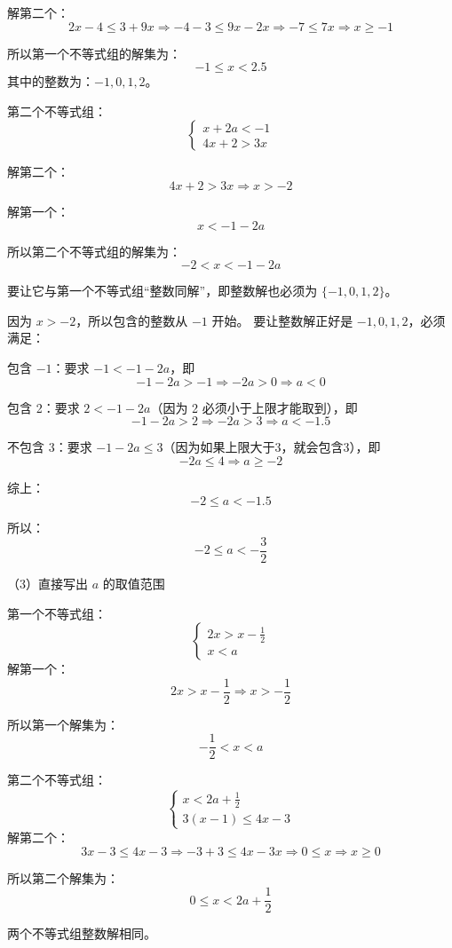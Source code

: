 解第二个：
\[
2x-4 \leq 3+9x \Rightarrow -4-3 \leq 9x-2x \Rightarrow -7 \leq 7x \Rightarrow x \geq -1
\]

所以第一个不等式组的解集为：
\[
-1 \leq x < 2.5
\]
其中的整数为：\(-1, 0, 1, 2\)。

第二个不等式组：
\[
\begin{cases}
x+2a < -1 \\
4x+2 > 3x
\end{cases}
\]

解第二个：
\[
4x+2 > 3x \Rightarrow x > -2
\]

解第一个：
\[
x < -1 - 2a
\]

所以第二个不等式组的解集为：
\[
-2 < x < -1 - 2a
\]

要让它与第一个不等式组“整数同解”，即整数解也必须为 \(\{-1, 0, 1, 2\}\)。

因为 \(x > -2\)，所以包含的整数从 \(-1\) 开始。
要让整数解正好是 \(-1, 0, 1, 2\)，必须满足：

包含 \(-1\)：要求 \(-1 < -1-2a\)，即
\[
-1-2a > -1 \Rightarrow -2a > 0 \Rightarrow a < 0
\]

包含 2：要求 \(2 < -1-2a\)（因为 2 必须小于上限才能取到），即
\[
-1-2a > 2 \Rightarrow -2a > 3 \Rightarrow a < -1.5
\]

不包含 3：要求 \(-1-2a \leq 3\)（因为如果上限大于3，就会包含3），即
\[
-2a \leq 4 \Rightarrow a \geq -2
\]

综上：
\[
-2 \leq a < -1.5
\]

所以：
\[
\boxed{-2 \leq a < -\frac{3}{2}}
\]

\bigskip

（3）直接写出 \(a\) 的取值范围

第一个不等式组：
\[
\begin{cases}
2x > x - \frac{1}{2} \\
x < a
\end{cases}
\]
解第一个：
\[
2x > x - \frac12 \Rightarrow x > -\frac12
\]

所以第一个解集为：
\[
-\frac12 < x < a
\]

第二个不等式组：
\[
\begin{cases}
x < 2a + \frac12 \\
3(x-1) \leq 4x - 3
\end{cases}
\]
解第二个：
\[
3x-3 \leq 4x-3 \Rightarrow -3+3 \leq 4x-3x \Rightarrow 0 \leq x \Rightarrow x \geq 0
\]

所以第二个解集为：
\[
0 \leq x < 2a + \frac12
\]

两个不等式组整数解相同。

